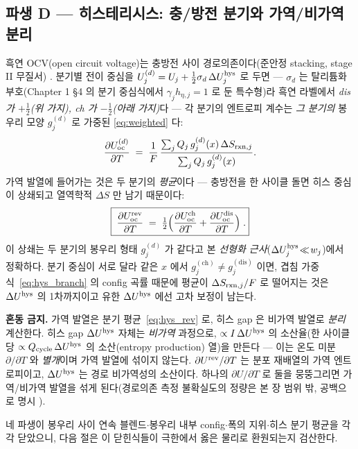 \subsection{파생 D --- 히스테리시스: 충/방전 분기와 가역/비가역 분리}\label{ssec:hys}
흑연 OCV(open circuit voltage)는 충방전 사이 경로의존이다(준안정 stacking, stage II 무질서)
\cite{hysteresis2018}. 분기별 전이 중심을 $U_j^{(d)}=U_j+\tfrac12\sigma_d\,\Delta U_j^{\mathrm{hys}}$ 로 두면 --- $\sigma_d$
는 탈리튬화 부호(Chapter 1 §4 의 분기 중심식에서 $\gamma_jh_{\eta,j}{=}1$ 로 둔 특수형)라 흑연 라벨에서 \emph{dis 가
$+\tfrac12$(위 가지), ch 가 $-\tfrac12$(아래 가지)}다 --- 각 분기의 엔트로피 계수는 \emph{그 분기의} 봉우리
모양 $g_j^{(d)}$ 로 가중된 \eqref{eq:weighted} 다:
\begin{equation}
\frac{\partial U_{\mathrm{oc}}^{(d)}}{\partial T}
\;=\;\frac1F\,\frac{\sum_j Q_j\,g_j^{(d)}(x)\,\Delta S_{\mathrm{rxn},j}}{\sum_j Q_j\,g_j^{(d)}(x)}.
\label{eq:hys_branch}
\end{equation}
가역 발열에 들어가는 것은 두 분기의 \emph{평균}이다 --- 충방전을 한 사이클 돌면 히스 중심이 상쇄되고 열역학적
$\Delta S$ 만 남기 때문이다:
\begin{equation}
\boxed{\;\frac{\partial U_{\mathrm{oc}}^{\mathrm{rev}}}{\partial T}
\;=\;\tfrac12\Bigl(\frac{\partial U_{\mathrm{oc}}^\mathrm{ch}}{\partial T}+\frac{\partial U_{\mathrm{oc}}^\mathrm{dis}}{\partial T}\Bigr)\;.}
\label{eq:hys_rev}
\end{equation}
이 상쇄는 두 분기의 봉우리 형태 $g_j^{(d)}$ 가 같다고 본 \emph{선형화 근사}($\Delta U_j^{\mathrm{hys}}\!\ll\!w_j$)에서
정확하다. 분기 중심이 서로 달라 같은 $x$ 에서 $g_j^{(\mathrm{ch})}\!\ne\!g_j^{(\mathrm{dis})}$ 이면, 겹침
가중식~\eqref{eq:hys_branch} 의 config 곡률 때문에 평균이 $\Delta S_{\mathrm{rxn},j}/F$ 로 떨어지는 것은 $\Delta U^{\mathrm{hys}}$
의 1차까지이고 유한 $\Delta U^{\mathrm{hys}}$ 에선 고차 보정이 남는다.
\begin{warnbox}
\textbf{혼동 금지.} 가역 발열은 분기 평균~\eqref{eq:hys_rev} 로, 히스 gap 은 비가역 발열로 \emph{분리} 계산한다.
히스 gap $\Delta U^{\mathrm{hys}}$ 자체는 \emph{비가역} 과정으로, $\propto I\,\Delta U^{\mathrm{hys}}$ 의 소산율(한 사이클당
$\propto Q_\mathrm{cycle}\,\Delta U^{\mathrm{hys}}$ 의 소산(entropy production) 열)을 만든다 --- 이는 온도 미분
$\partial/\partial T$ 와 \emph{별개}이며 가역 발열에 섞이지 않는다. $\partial U^{\mathrm{rev}}/\partial T$ 는 분포 재배열의
가역 엔트로피이고, $\Delta U^{\mathrm{hys}}$ 는 경로 비가역성의 소산이다. 하나의 $\partial U/\partial T$ 로 둘을
뭉뚱그리면 가역/비가역 발열을 섞게 된다(경로의존 측정 불확실도의 정량은 본 장 범위 밖, 공백으로 명시
\cite{hysteresis2018}).
\end{warnbox}
네 파생이 봉우리 사이 연속 블렌드$\cdot$봉우리 내부 config$\cdot$폭의 지위$\cdot$히스 분기 평균을 각각 닫았으니,
다음 절은 이 닫힌식들이 극한에서 옳은 물리로 환원되는지 검산한다.

